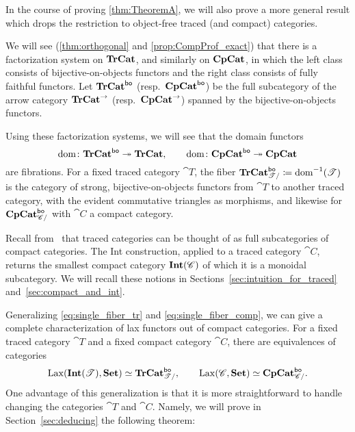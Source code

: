 \documentclass[11pt,oneside,article]{memoir}
\begin{document}
In the course of proving \ref{thm:TheoremA}, we will also prove a more general result which drops
the restriction to object-free traced (and compact) categories.

We will see (\ref{thm:orthogonal} and \ref{prop:CompProf_exact}) that there is a factorization
system on $\mathbf{TrCat}$, and similarly on $\mathbf{CpCat}$, in which the left class consists of bijective-on-objects
functors and the right class consists of fully faithful functors. Let $\mathbf{TrCat}^{\mathsf{bo}}$
(resp.~$\mathbf{CpCat}^{\mathsf{bo}}$) be the full subcategory of the arrow category $\mathbf{TrCat}^{\to}$
(resp.~$\mathbf{CpCat}^{\to}$) spanned by the bijective-on-objects functors.

Using these factorization systems, we will see that the domain functors
$$\operatorname{dom}\colon\mathbf{TrCat}^{\mathsf{bo}}\twoheadrightarrow\mathbf{TrCat},\qquad\operatorname{dom}\colon\mathbf{CpCat}^{\mathsf{bo}}\twoheadrightarrow\mathbf{CpCat}$$
are fibrations. For a fixed traced category
$\cat{T}$, the fiber $\mathbf{TrCat}^{\mathsf{bo}}_{\mathscr{T}/}\coloneqq\operatorname{dom}^{-1}(\mathscr{T})$ is the category of strong,
bijective-on-objects functors from $\cat{T}$ to another traced category, with the evident
commutative triangles as morphisms, and likewise for $\mathbf{CpCat}^{\mathsf{bo}}_{\mathscr{C}/}$ with $\cat{C}$ a compact category.

Recall from~\cite{JoyalStreetVerity} that traced categories can be thought of as full subcategories
of compact categories.  The Int construction, applied to a traced category $\cat{C}$, returns the
smallest compact category $\mathbf{Int}(\mathscr{C})$ of which it is a monoidal subcategory. We will recall these
notions in Sections~\ref{sec:intuition_for_traced} and~\ref{sec:compact_and_int}.

Generalizing \eqref{eq:single_fiber_tr} and \eqref{eq:single_fiber_comp}, we can give a complete characterization of lax functors out of compact categories. For a fixed traced
category $\cat{T}$ and a fixed compact category $\cat{C}$, there are equivalences of categories
\begin{equation}\label{eqn:lax_compcat_bo}
   \operatorname{Lax}(\mathbf{Int}(\mathscr{T}),\mathbf{Set})\simeq\mathbf{TrCat}^{\mathsf{bo}}_{\mathscr{T}/},
   \qquad
   \operatorname{Lax}(\mathscr{C},\mathbf{Set})\simeq\mathbf{CpCat}^{\mathsf{bo}}_{\mathscr{C}/}.
\end{equation}
One advantage of this generalization is that it is more straightforward to handle changing the
categories $\cat{T}$ and $\cat{C}$. Namely, we will prove in Section~\ref{sec:deducing} the
following theorem:
\end{document}
